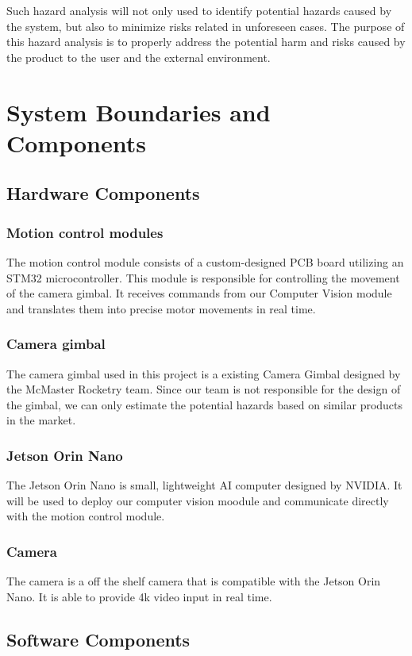\documentclass{article}
\begin{document}
Such hazard analysis will not only used to identify potential hazards caused by
the system, but also to minimize risks related in unforeseen cases. The purpose
of this hazard analysis is to properly address the potential harm and risks
caused by the product to the user and the external environment.

\section{System Boundaries and Components}

\subsection{Hardware Components}
\subsubsection{Motion control modules}
The motion control module consists of a custom-designed PCB board utilizing an
STM32 microcontroller. This module is responsible for controlling the movement
of the camera gimbal. It receives commands from our Computer Vision module and
translates them into precise motor movements in real time.
\subsubsection{Camera gimbal}
The camera gimbal used in this project is a existing Camera Gimbal designed by
the McMaster Rocketry team. Since our team is not responsible for the design of
the gimbal, we can only estimate the potential hazards based on similar
products in the market.
\subsubsection{Jetson Orin Nano}
The Jetson Orin Nano is small, lightweight AI computer designed by NVIDIA. It
will be used to deploy our computer vision moodule and communicate directly
with the motion control module.
\subsubsection{Camera}
The camera is a off the shelf camera that is compatible with the Jetson Orin
Nano. It is able to provide 4k video input in real time.

\subsection{Software Components}
\end{document}
